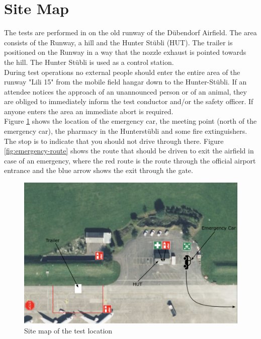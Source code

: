 \documentclass{article}
\begin{document}
\newpage

\section{Site Map}
The tests are performed in on the old runway of the Dübendorf Airfield. The area consists of the Runway, a hill and the Hunter Stübli (HUT). The trailer is positioned on the Runway in a way that the nozzle exhaust is pointed towards the hill. The Hunter Stübli is used as a control station. \\
\noindent
During test operations no external people should enter the entire area of the runway "Lili 15" from the mobile field hangar down to the Hunter-Stübli. If an attendee notices the approach of an unannounced person or of an animal, they are obliged to immediately inform the test conductor and/or the safety officer. If anyone enters the area an immediate abort is required. \\
\noindent
Figure \ref{fig:location-plan} shows the location of the emergency car, the meeting point (north of the emergency car), the pharmacy in the Hunterstübli and some fire extinguishers. The stop is to indicate that you should not drive through there. 
Figure \ref{fig:emergency-route} shows the route that should be driven to exit the airfield in case of an emergency, where the red route is the route through the official airport entrance and the blue arrow shows the exit through the gate.
\begin{figure}[h]
    \centering
    \includegraphics[width=\textwidth]{assets/location_map.png}
    \caption{Site map of the test location}
    \label{fig:location-plan}
\end{figure}
\end{document}
